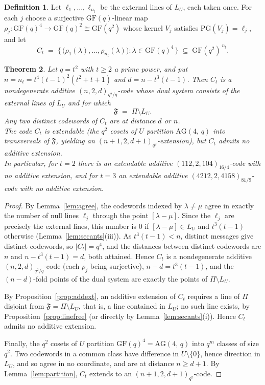 \documentclass[12pt]{article}
\newtheorem{thm}{Theorem}[section]
\theoremstyle{definition}
\newtheorem{defn}[thm]{Definition}
\numberwithin{equation}{section}
\newcommand{\la}{\lambda}
\newcommand{\GF}[1]{\mathrm{GF}(#1)}
\newcommand{\PGv}[1]{\mathrm{PG}(#1)}
\newcommand{\AG}[2]{\mathrm{AG}(#1,\,#2)}
\newcommand{\Afold}{\mathfrak{F}}
\begin{document}
\begin{defn}\label{defn:codeCt}
Let $\ell_1,\ldots,\ell_{n_t}$ be the external lines of $L_U$, each taken once.  For each $j$ choose a surjective $\GF{q}$-linear map $\rho_j:\GF{q}^4\to\GF{q}^2\cong\GF{q^2}$ whose kernel $V_j$ satisfies $\PGv{V_j}=\ell_j$, and let
\[
  C_t \;=\;\bigl\{\,\bigl(\rho_1(\la),\ldots,\rho_{n_t}(\la)\bigr) :
  \la\in\GF{q}^{4}\,\bigr\}\;\subseteq\;\GF{q^2}^{\,n_t}.
\]
\end{defn}

\begin{thm}\label{thm:scattercode}
Let $q=t^2$ with $t\geq2$ a prime power, and put $n=n_t=t^4(t-1)^2(t^2+t+1)$ and $d=n-t^3(t-1)$.  Then $C_t$ is a nondegenerate additive $(n,2,d)_{q^2/q}$-code whose dual system consists of the external lines of $L_U$ and for which
\[
  \Afold\;=\;\Pi\setminus L_U .
\]
Any two distinct codewords of $C_t$ are at distance $d$ or $n$.\\ 
The code $C_t$ is extendable (the $q^2$ cosets of $U$ partition $\AG4q$ into transversals of $\Afold$, yielding an $(n+1,2,d+1)_{q^2}$-extension), but $C_t$ admits no additive extension.\\
In particular, for $t=2$ there is an extendable additive $(112,2,104)_{16/4}$-code with no additive extension, and for $t=3$ an extendable additive $(4212,2,4158)_{81/9}$-code with no additive extension.
\end{thm}

\begin{proof}
By Lemma~\ref{lem:agree}, the codewords indexed by $\la\neq\mu$ agree in exactly the number of null lines $\ell_j$ through the point $[\la-\mu]$. Since the $\ell_j$ are precisely the external lines, this number is $0$ if $[\la-\mu]\in L_U$ and $t^3(t-1)$ otherwise (Lemma~\ref{lem:secants}(iii)).  As $t^3(t-1)<n$, distinct messages give distinct codewords, so $|C_t|=q^4$, and the distances between distinct codewords are $n$ and $n-t^3(t-1)=d$, both attained.  Hence $C_t$ is a nondegenerate additive $(n,2,d)_{q^2/q}$-code (each $\rho_j$ being surjective), $n-d=t^3(t-1)$, and the $(n-d)$-fold points of the dual system are exactly the points of $\Pi\setminus L_U$.

By Proposition~\ref{prop:addext}, an additive extension of $C_t$ requires a line of $\Pi$ disjoint from $\Afold=\Pi\setminus L_U$, that is, a line contained in $L_U$; no such line exists, by Proposition~\ref{prop:linefree} (or directly by Lemma~\ref{lem:secants}(i)).  Hence $C_t$ admits no additive extension.

Finally, the $q^2$ cosets of $U$ partition $\GF{q}^4=\AG4q$ into $q^m$ classes of size $q^2$.  Two codewords in a common class have difference in $U\setminus\{0\}$, hence direction in $L_U$, and so agree in no coordinate, and are at distance $n\geq d+1$.  By Lemma~\ref{lem:partition}, $C_t$ extends to an $(n+1,2,d+1)_{q^2}$-code. 
\end{proof}
\end{document}
